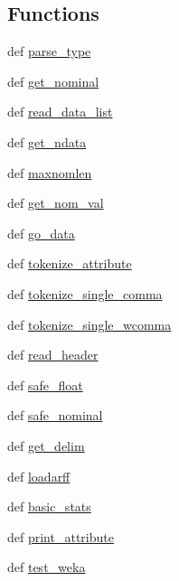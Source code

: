 \subsection*{Functions}
\begin{DoxyCompactItemize}
\item 
def \hyperlink{namespacescipy_1_1io_1_1arff_1_1arffread_a4bad8711d4b0984398467dfe02b1a201}{parse\+\_\+type}
\item 
def \hyperlink{namespacescipy_1_1io_1_1arff_1_1arffread_a33a2d24de0c0352307b66f6f6d7cc60a}{get\+\_\+nominal}
\item 
def \hyperlink{namespacescipy_1_1io_1_1arff_1_1arffread_a2196d480511610faa3805bbd40e0b6ad}{read\+\_\+data\+\_\+list}
\item 
def \hyperlink{namespacescipy_1_1io_1_1arff_1_1arffread_ac11ed0cadf89fa8171a8e2f3d0ca9f9c}{get\+\_\+ndata}
\item 
def \hyperlink{namespacescipy_1_1io_1_1arff_1_1arffread_af0f4cd3472755ee6787546ec3b9eb71d}{maxnomlen}
\item 
def \hyperlink{namespacescipy_1_1io_1_1arff_1_1arffread_ad9efac4fec1c1cdf9f365051f03e73be}{get\+\_\+nom\+\_\+val}
\item 
def \hyperlink{namespacescipy_1_1io_1_1arff_1_1arffread_a11b025d9de12c44c0e9e95159597e17c}{go\+\_\+data}
\item 
def \hyperlink{namespacescipy_1_1io_1_1arff_1_1arffread_af49ecbda8a1a3c4e49b99762417a0ce2}{tokenize\+\_\+attribute}
\item 
def \hyperlink{namespacescipy_1_1io_1_1arff_1_1arffread_a45e94ad9534ae595c39db52936b7eec9}{tokenize\+\_\+single\+\_\+comma}
\item 
def \hyperlink{namespacescipy_1_1io_1_1arff_1_1arffread_ab534ddd062d540f80295abf123309517}{tokenize\+\_\+single\+\_\+wcomma}
\item 
def \hyperlink{namespacescipy_1_1io_1_1arff_1_1arffread_a2b0156e1b5a63045128183602a72b623}{read\+\_\+header}
\item 
def \hyperlink{namespacescipy_1_1io_1_1arff_1_1arffread_a0f1d281989898c67529e346386b59997}{safe\+\_\+float}
\item 
def \hyperlink{namespacescipy_1_1io_1_1arff_1_1arffread_a589fe15a70188424c931e0c9ab53a82f}{safe\+\_\+nominal}
\item 
def \hyperlink{namespacescipy_1_1io_1_1arff_1_1arffread_a81f0f18e6285e6cd7dd238dda4ce1473}{get\+\_\+delim}
\item 
def \hyperlink{namespacescipy_1_1io_1_1arff_1_1arffread_a60f6a18abd738377a264b050ed020902}{loadarff}
\item 
def \hyperlink{namespacescipy_1_1io_1_1arff_1_1arffread_abff74baccf448c554497739e42b7b7dc}{basic\+\_\+stats}
\item 
def \hyperlink{namespacescipy_1_1io_1_1arff_1_1arffread_ad2dc9487c31877724240b2fa8f550998}{print\+\_\+attribute}
\item 
def \hyperlink{namespacescipy_1_1io_1_1arff_1_1arffread_a5a73a07619f6d27e3220eaa3c24144a0}{test\+\_\+weka}
\end{DoxyCompactItemize}
